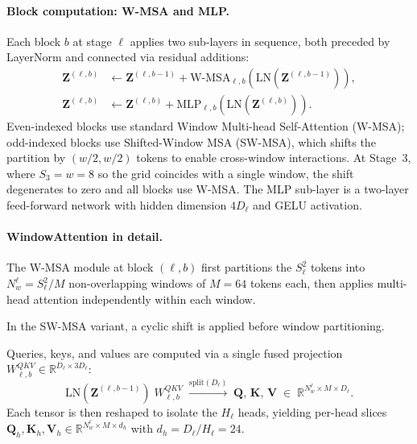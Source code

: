 \paragraph{Block computation: W-MSA and MLP.}
Each block $b$ at stage $\ell$ applies two sub-layers in sequence, both
preceded by LayerNorm and connected via residual additions:
\begin{align}
    \mathbf{Z}^{(\ell,b)}
        &\leftarrow \mathbf{Z}^{(\ell,b-1)} +
          \mathrm{W\text{-}MSA}_{\ell,b}\!\left(
            \mathrm{LN}\!\left(\mathbf{Z}^{(\ell,b-1)}\right)
          \right), \label{eq:residual_attn} \\[4pt]
    \mathbf{Z}^{(\ell,b)}
        &\leftarrow \mathbf{Z}^{(\ell,b)} +
          \mathrm{MLP}_{\ell,b}\!\left(
            \mathrm{LN}\!\left(\mathbf{Z}^{(\ell,b)}\right)
          \right). \label{eq:residual_mlp}
\end{align}
Even-indexed blocks use standard Window Multi-head Self-Attention (W-MSA);
odd-indexed blocks use Shifted-Window MSA (SW-MSA), which shifts the
partition by $(w/2, w/2)$ tokens to enable cross-window interactions.
At Stage~3, where $S_3 = w = 8$ so the grid coincides with a single window,
the shift degenerates to zero and all blocks use W-MSA. The MLP sub-layer
is a two-layer feed-forward network with hidden dimension $4D_\ell$ and GELU
activation.

\paragraph{WindowAttention in detail.}
The W-MSA module at block $(\ell, b)$ first partitions the $S_\ell^2$ tokens
into $N_w^\ell = S_\ell^2 / M$ non-overlapping windows of $M = 64$ tokens
each, then applies multi-head attention independently within each window.

In the SW-MSA variant, a cyclic shift is applied before window partitioning.

Queries, keys, and values are computed via a single fused projection
$W^{QKV}_{\ell,b} \in \mathbb{R}^{D_\ell \times 3D_\ell}$:
\begin{equation}
    \mathrm{LN}(\mathbf{Z}^{(\ell,b-1)})\;W^{QKV}_{\ell,b}
    \;\xrightarrow{\text{split}(D_\ell)}\;
    \mathbf{Q},\,\mathbf{K},\,\mathbf{V}
    \;\in\; \mathbb{R}^{N_w^\ell \times M \times D_\ell}.
\end{equation}
Each tensor is then reshaped to isolate the $H_\ell$ heads, yielding
per-head slices $\mathbf{Q}_h, \mathbf{K}_h, \mathbf{V}_h
\in \mathbb{R}^{N_w^\ell \times M \times d_h}$
with $d_h = D_\ell / H_\ell = 24$.

